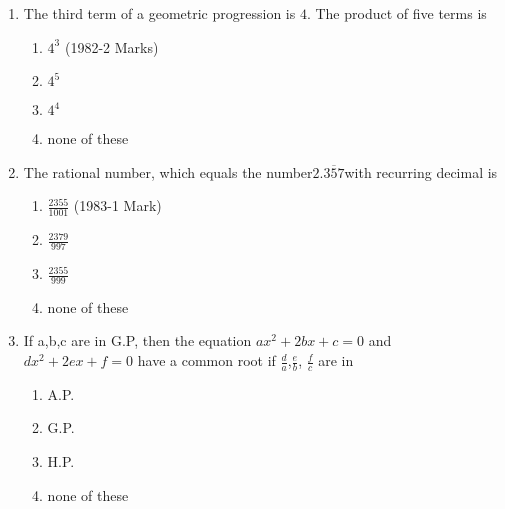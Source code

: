 \documentclass[journal,12pt,twocolumn]{IEEEtran}
\theoremstyle{remark}
\begin{document}
\begin{enumerate}
	\item  The third term of a geometric progression is $4$. The product of five terms is 
    
\begin{enumerate}
     \item${4^3}$ \hfill(1982-2 Marks)
    \item${4^5}$
    \item${4^4}$
    \item none of these
\end{enumerate}

	\item The rational number, which equals the number$2.\overline{357}$with recurring decimal is 
    
    \begin{enumerate}
        \item $\frac{2355}{1001}$ \hfill(1983-1 Mark) \\
        \item $\frac{2379}{997}$ \\
        \item $\frac{2355}{999}$ \\
        \item none of these 
    \end{enumerate} 
    
	    \item  If a,b,c are in G.P, then the equation ${ax^2+2bx+c=0}$
        and ${dx^2+2ex+f=0}$ have a common root if  ${\frac{d}{a}}$,${\frac{e}{b}}$, ${\frac{f}{c}}$ are in 
         
         \begin{enumerate}
             \item A.P.
             \item G.P.
             \item H.P.
             \item none of these 
             
         \end{enumerate}

\end{enumerate}
\end{document}
